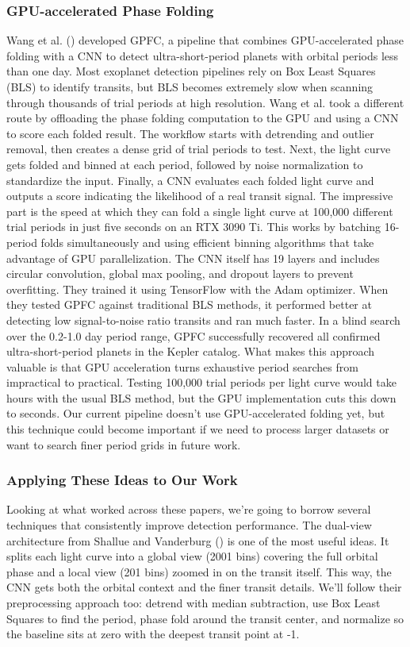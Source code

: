 \documentclass[letterpaper]{article} %
\begin{document}
\subsubsection{GPU-accelerated Phase Folding}
Wang et al. (\citeyear{Wang2024gpfc}) developed GPFC, a pipeline that combines GPU-accelerated phase folding with a CNN to detect ultra-short-period planets with orbital periods less than one day. Most exoplanet detection pipelines rely on Box Least Squares (BLS) to identify transits, but BLS becomes extremely slow when scanning through thousands of trial periods at high resolution. Wang et al. took a different route by offloading the phase folding computation to the GPU and using a CNN to score each folded result. The workflow starts with detrending and outlier removal, then creates a dense grid of trial periods to test. Next, the light curve gets folded and binned at each period, followed by noise normalization to standardize the input. Finally, a CNN evaluates each folded light curve and outputs a score indicating the likelihood of a real transit signal. The impressive part is the speed at which they can fold a single light curve at 100,000 different trial periods in just five seconds on an RTX 3090 Ti. This works by batching 16-period folds simultaneously and using efficient binning algorithms that take advantage of GPU parallelization. The CNN itself has 19 layers and includes circular convolution, global max pooling, and dropout layers to prevent overfitting. They trained it using TensorFlow with the Adam optimizer. When they tested GPFC against traditional BLS methods, it performed better at detecting low signal-to-noise ratio transits and ran much faster. In a blind search over the 0.2-1.0 day period range, GPFC successfully recovered all confirmed ultra-short-period planets in the Kepler catalog. What makes this approach valuable is that GPU acceleration turns exhaustive period searches from impractical to practical. Testing 100,000 trial periods per light curve would take hours with the usual BLS method, but the GPU implementation cuts this down to seconds. Our current pipeline doesn't use GPU-accelerated folding yet, but this technique could become important if we need to process larger datasets or want to search finer period grids in future work.

\subsubsection{Applying These Ideas to Our Work}
Looking at what worked across these papers, we're going to borrow several techniques that consistently improve detection performance. The dual-view architecture from Shallue and Vanderburg (\citeyear{Shallue2018identifyexoplanetsI}) is one of the most useful ideas. It splits each light curve into a global view (2001 bins) covering the full orbital phase and a local view (201 bins) zoomed in on the transit itself. This way, the CNN gets both the orbital context and the finer transit details. We'll follow their preprocessing approach too: detrend with median subtraction, use Box Least Squares to find the period, phase fold around the transit center, and normalize so the baseline sits at zero with the deepest transit point at -1.
\end{document}
